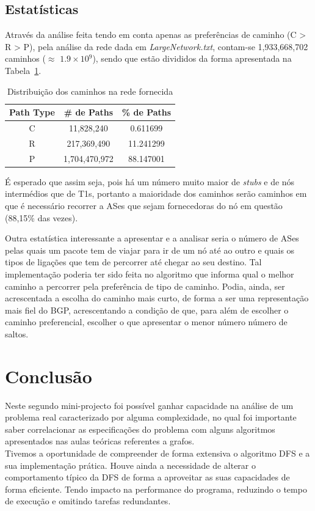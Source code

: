 \documentclass[twocolumn]{article} %
\begin{document}
		\subsection{Estatísticas}
			Através da análise feita tendo em conta apenas as preferências de caminho (C > R > P), pela análise da rede dada em \emph{LargeNetwork.txt}, contam-se 1,933,668,702 caminhos ($\approx$ $1.9\times 10$$^{9}$), sendo que estão divididos da forma apresentada na Tabela~\ref{Tabela1}.
			
			\vfill

			\begin{table}[htbp]
				\caption{Distribuição dos caminhos na rede fornecida}
				\begin{center}
					\begin{tabular}{|c||c||c|}
						\hline
						Path Type &	\# de Paths & \% de Paths \\
						\hline
						C & 11,828,240 & 0.611699\\
						\hline
						R & 217,369,490 & 11.241299\\
						\hline
						P & 1,704,470,972 & 88.147001\\
						\hline
					\end{tabular}
				\end{center}
				\label{Tabela1}
			\end{table}

			\noindent É esperado que assim seja, pois há um número muito maior de \emph{stubs} e de nós intermédios que de T1s, portanto a maioridade dos caminhos serão caminhos em que é necessário recorrer a ASes que sejam fornecedoras do nó em questão (88,15\% das vezes).

			\noindent Outra estatística interessante a apresentar e a analisar seria o número de ASes pelas quais um pacote tem de viajar para ir de um nó até ao outro e quais os tipos de ligações que tem de percorrer até chegar ao seu destino. Tal implementação poderia ter sido feita no algoritmo que informa qual o melhor caminho a percorrer pela preferência de tipo de caminho. Podia, ainda, ser acrescentada a escolha do caminho mais curto, de forma a ser uma representação mais fiel do BGP, acrescentando a condição de que, para além de escolher o caminho preferencial, escolher o que apresentar o menor número número de saltos.

	\section{Conclusão}
		Neste segundo mini-projecto foi possível ganhar capacidade na análise de um problema real caracterizado por alguma complexidade, no qual foi importante saber correlacionar as especificações do problema com alguns algoritmos apresentados nas aulas teóricas referentes a grafos.\\

		\noindent Tivemos a oportunidade de compreender de forma extensiva o algoritmo DFS e a sua implementação prática. Houve ainda a necessidade de alterar o comportamento típico da DFS de forma a aproveitar as suas capacidades de forma eficiente. Tendo impacto na performance do programa, reduzindo o tempo de execução e omitindo tarefas redundantes.\\
	
\end{document}
